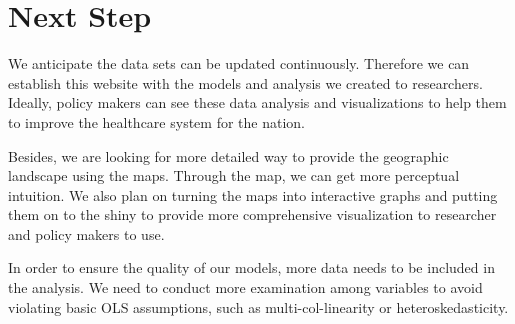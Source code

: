 \documentclass{article}
\begin{document}
\section{Next Step}
We anticipate the data sets can be updated continuously. Therefore we can establish this website with the models and analysis we created to researchers. Ideally, policy makers can see these data analysis and visualizations to help them to improve the healthcare system for the nation. 

Besides, we are looking for more detailed way to provide the geographic landscape using the maps. Through the map, we can get more perceptual intuition. We also plan on turning the maps into interactive graphs and putting them on to the shiny to provide more comprehensive visualization to researcher and policy makers to use. 

In order to ensure the quality of our models, more data needs to be included in the analysis. We need to conduct more examination among variables to avoid violating basic OLS assumptions, such as multi-col-linearity or heteroskedasticity. 
\end{document}
